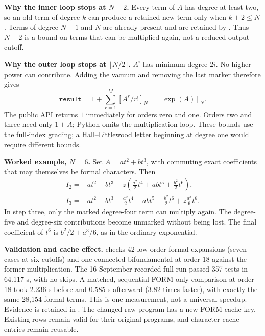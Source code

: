 \textbf{Why the inner loop stops at $N-2$.}
Every term of $A$ has degree at least two, so an old term of degree $k$ can
produce a retained new term only when $k+2\leq N$. Terms of degree $N-1$ and
$N$ are already present and are retained by . Thus $N-2$ is a
bound on terms that can be multiplied again, not a reduced output cutoff.

\textbf{Why the outer loop stops at $\lfloor N/2\rfloor$.}
$A^i$ has minimum degree $2i$. No higher power can contribute. Adding the
vacuum and removing the last marker therefore gives
\[
 \texttt{result}=1+\sum_{r=1}^{M}[A^r/r!]_N=[\exp(A)]_N.
\]
The public API returns $1$ immediately for orders zero and one. Orders two
and three need only $1+A$; Python omits the multiplication loop. These bounds
use the full-index grading; a Hall--Littlewood letter beginning at degree one
would require different bounds.

\textbf{Worked example, $N=6$.} Set $A=a t^2+b t^3$, with commuting exact
coefficients that may themselves be formal characters. Then
\[
 \begin{aligned}
 I_2={}&a t^2+b t^3+
 z\left(\frac{a^2}{2}t^4+ab t^5+\frac{b^2}{2}t^6\right),\\
 I_3={}&a t^2+b t^3+\frac{a^2}{2}t^4+ab t^5+\frac{b^2}{2}t^6
       +z\frac{a^3}{6}t^6.
 \end{aligned}
\]
In step three, only the marked degree-four term can multiply again. The
degree-five and degree-six contributions become unmarked without being lost.
The final coefficient of $t^6$ is $b^2/2+a^3/6$, as in the ordinary exponential.

\textbf{Validation and cache effect.} 
checks 42 low-order formal expansions (seven cases at six cutoffs) and one
connected bifundamental at order 18 against the former multiplication. The
16 September recorded full run passed 357 tests in 64.117 s, with no skips.
A matched, sequential FORM-only comparison at order 18 took 2.236 s before
and 0.585 s afterward (3.82 times faster), with exactly the same 28,154 formal
terms. This is one measurement, not a universal speedup. Evidence is retained
in .
The changed raw program has a new FORM-cache key. Existing rows remain valid
for their original programs, and character-cache entries remain reusable.

